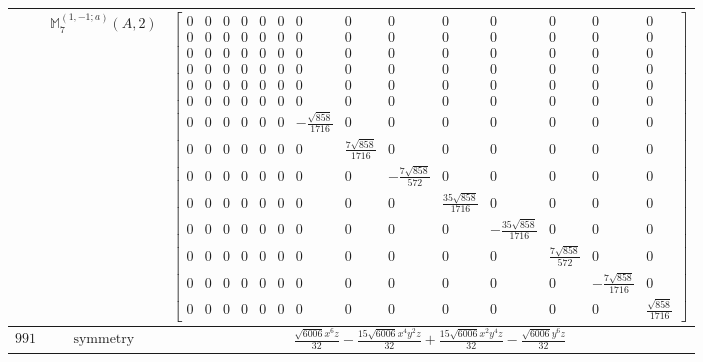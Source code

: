 \documentclass[fleqn,8pt,landscape]{jsarticle}
\begin{document}
\begin{longtable}{ccc}
$  $ & $ \mathbb{M}_{7}^{(1,-1;a)}(A,2) $ & $ \begin{bmatrix} 0 & 0 & 0 & 0 & 0 & 0 & 0 & 0 & 0 & 0 & 0 & 0 & 0 & 0 \\ 0 & 0 & 0 & 0 & 0 & 0 & 0 & 0 & 0 & 0 & 0 & 0 & 0 & 0 \\ 0 & 0 & 0 & 0 & 0 & 0 & 0 & 0 & 0 & 0 & 0 & 0 & 0 & 0 \\ 0 & 0 & 0 & 0 & 0 & 0 & 0 & 0 & 0 & 0 & 0 & 0 & 0 & 0 \\ 0 & 0 & 0 & 0 & 0 & 0 & 0 & 0 & 0 & 0 & 0 & 0 & 0 & 0 \\ 0 & 0 & 0 & 0 & 0 & 0 & 0 & 0 & 0 & 0 & 0 & 0 & 0 & 0 \\ 0 & 0 & 0 & 0 & 0 & 0 & - \frac{\sqrt{858}}{1716} & 0 & 0 & 0 & 0 & 0 & 0 & 0 \\ 0 & 0 & 0 & 0 & 0 & 0 & 0 & \frac{7 \sqrt{858}}{1716} & 0 & 0 & 0 & 0 & 0 & 0 \\ 0 & 0 & 0 & 0 & 0 & 0 & 0 & 0 & - \frac{7 \sqrt{858}}{572} & 0 & 0 & 0 & 0 & 0 \\ 0 & 0 & 0 & 0 & 0 & 0 & 0 & 0 & 0 & \frac{35 \sqrt{858}}{1716} & 0 & 0 & 0 & 0 \\ 0 & 0 & 0 & 0 & 0 & 0 & 0 & 0 & 0 & 0 & - \frac{35 \sqrt{858}}{1716} & 0 & 0 & 0 \\ 0 & 0 & 0 & 0 & 0 & 0 & 0 & 0 & 0 & 0 & 0 & \frac{7 \sqrt{858}}{572} & 0 & 0 \\ 0 & 0 & 0 & 0 & 0 & 0 & 0 & 0 & 0 & 0 & 0 & 0 & - \frac{7 \sqrt{858}}{1716} & 0 \\ 0 & 0 & 0 & 0 & 0 & 0 & 0 & 0 & 0 & 0 & 0 & 0 & 0 & \frac{\sqrt{858}}{1716} \end{bmatrix} $ \\ \hline
$ 991 $ & $ \text{symmetry} $ & $ \frac{\sqrt{6006} x^{6} z}{32} - \frac{15 \sqrt{6006} x^{4} y^{2} z}{32} + \frac{15 \sqrt{6006} x^{2} y^{4} z}{32} - \frac{\sqrt{6006} y^{6} z}{32} $ \\

\end{longtable}
\end{document}
